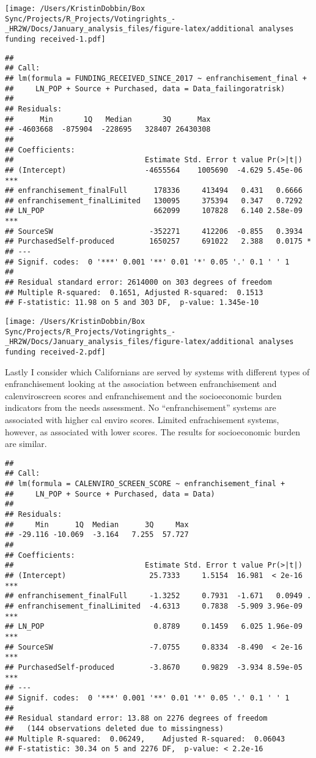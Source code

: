 \documentclass[
]{article}
\begin{document}
\texttt{[image: /Users/KristinDobbin/Box Sync/Projects/R\_Projects/Votingrights\_-\_HR2W/Docs/January\_analysis\_files/figure-latex/additional analyses funding received-1.pdf]}

\begin{verbatim}
## 
## Call:
## lm(formula = FUNDING_RECEIVED_SINCE_2017 ~ enfranchisement_final + 
##     LN_POP + Source + Purchased, data = Data_failingoratrisk)
## 
## Residuals:
##      Min       1Q   Median       3Q      Max 
## -4603668  -875904  -228695   328407 26430308 
## 
## Coefficients:
##                              Estimate Std. Error t value Pr(>|t|)    
## (Intercept)                  -4655564    1005690  -4.629 5.45e-06 ***
## enfranchisement_finalFull      178336     413494   0.431   0.6666    
## enfranchisement_finalLimited   130095     375394   0.347   0.7292    
## LN_POP                         662099     107828   6.140 2.58e-09 ***
## SourceSW                      -352271     412206  -0.855   0.3934    
## PurchasedSelf-produced        1650257     691022   2.388   0.0175 *  
## ---
## Signif. codes:  0 '***' 0.001 '**' 0.01 '*' 0.05 '.' 0.1 ' ' 1
## 
## Residual standard error: 2614000 on 303 degrees of freedom
## Multiple R-squared:  0.1651, Adjusted R-squared:  0.1513 
## F-statistic: 11.98 on 5 and 303 DF,  p-value: 1.345e-10
\end{verbatim}

\texttt{[image: /Users/KristinDobbin/Box Sync/Projects/R\_Projects/Votingrights\_-\_HR2W/Docs/January\_analysis\_files/figure-latex/additional analyses funding received-2.pdf]}

Lastly I consider which Californians are served by systems with
different types of enfranchisement looking at the association between
enfranchisement and calenviroscreen scores and enfranchisement and the
socioeconomic burden indicators from the needs assessment. No
``enfranchisement'' systems are associated with higher cal enviro
scores. Limited enfrachisement systems, however, as associated with
lower scores. The results for socioeconomic burden are similar.

\begin{verbatim}
## 
## Call:
## lm(formula = CALENVIRO_SCREEN_SCORE ~ enfranchisement_final + 
##     LN_POP + Source + Purchased, data = Data)
## 
## Residuals:
##     Min      1Q  Median      3Q     Max 
## -29.116 -10.069  -3.164   7.255  57.727 
## 
## Coefficients:
##                              Estimate Std. Error t value Pr(>|t|)    
## (Intercept)                   25.7333     1.5154  16.981  < 2e-16 ***
## enfranchisement_finalFull     -1.3252     0.7931  -1.671   0.0949 .  
## enfranchisement_finalLimited  -4.6313     0.7838  -5.909 3.96e-09 ***
## LN_POP                         0.8789     0.1459   6.025 1.96e-09 ***
## SourceSW                      -7.0755     0.8334  -8.490  < 2e-16 ***
## PurchasedSelf-produced        -3.8670     0.9829  -3.934 8.59e-05 ***
## ---
## Signif. codes:  0 '***' 0.001 '**' 0.01 '*' 0.05 '.' 0.1 ' ' 1
## 
## Residual standard error: 13.88 on 2276 degrees of freedom
##   (144 observations deleted due to missingness)
## Multiple R-squared:  0.06249,    Adjusted R-squared:  0.06043 
## F-statistic: 30.34 on 5 and 2276 DF,  p-value: < 2.2e-16
\end{verbatim}
\end{document}
